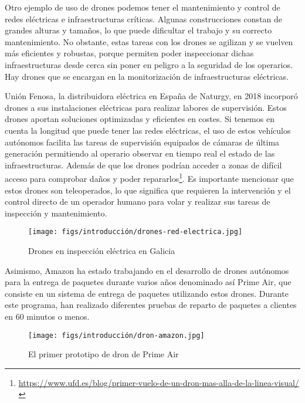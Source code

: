 Otro ejemplo de uso de drones podemos tener el mantenimiento y control de redes eléctricas e infraestructuras críticas. Algunas construcciones constan de grandes alturas y tamaños, lo que puede
dificultar el trabajo y su correcto mantenimiento. No obstante, estas tareas con los drones se agilizan y se vuelven más eficientes y robustas, porque permiten poder
inspeccionar dichas infraestructuras desde cerca sin poner en peligro a la seguridad de los operarios. 
Hay drones que se encargan en la monitorización de infraestructuras eléctricas. 

Unión Fenosa, la distribuidora eléctrica en España de Naturgy, en 2018 incorporó drones a sus instalaciones eléctricas para realizar labores de supervisión. Estos drones aportan 
soluciones optimizadas y eficientes en costes. Si tenemos en cuenta la longitud que puede tener las redes eléctricas, el uso de estos vehículos
autónomos facilita las tareas de supervisión equipados de cámaras de última generación permitiendo al operario observar en tiempo real el estado de las infraestructuras. Además de que los
drones podrían acceder a zonas de difícil acceso para comprobar daños y poder repararlos\footnote{\url{https://www.ufd.es/blog/primer-vuelo-de-un-dron-mas-alla-de-la-linea-visual/}}.  
Es importante mencionar que estos drones son teleoperados, lo que significa que requieren la intervención y el control directo de un operador humano para volar y realizar sus tareas 
de inspección y mantenimiento.

\begin{figure} [H]
  \begin{center}
    \texttt{[image: figs/introducción/drones-red-electrica.jpg]}
  \end{center}
  \caption{Drones en inspección eléctrica en Galicia}
  \label{fig:Fenosa}
  \vspace{-1.5em}
\end{figure}

Asimismo, Amazon ha estado trabajando en el desarrollo de drones autónomos para la entrega de paquetes durante varios años denominado así Prime Air\cite{AmazonPrimeAir}, 
que consiste en un sistema de entrega de paquetes utilizando estos drones. Durante este programa, han realizado diferentes pruebas de reparto de paquetes a clientes
en 60 minutos o menos. 

\begin{figure} [H]
  \begin{center}
    \texttt{[image: figs/introducción/dron-amazon.jpg]}
  \end{center}
  \caption{El primer prototipo de dron de Prime Air}
  \label{fig:PrimerPrimeAir}
  \vspace{-1.5em}
\end{figure}

